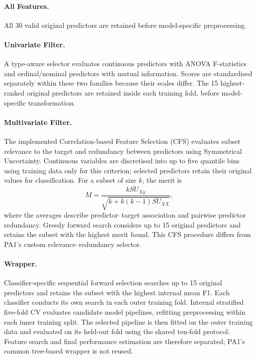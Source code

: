 \paragraph{All Features.} All 30 valid original predictors are retained before model-specific preprocessing.

\paragraph{Univariate Filter.} A type-aware selector evaluates continuous predictors with ANOVA F-statistics and ordinal/nominal predictors with mutual information. Scores are standardised separately within these two families because their scales differ. The 15 highest-ranked original predictors are retained inside each training fold, before model-specific transformation.

\paragraph{Multivariate Filter.} The implemented Correlation-based Feature Selection (CFS) evaluates subset relevance to the target and redundancy between predictors using Symmetrical Uncertainty. Continuous variables are discretised into up to five quantile bins using training data only for this criterion; selected predictors retain their original values for classification. For a subset of size $k$, the merit is
\[
 M=\frac{k\overline{SU}_{Xy}}
 {\sqrt{k+k(k-1)\overline{SU}_{XX}}},
\]
where the averages describe predictor--target association and pairwise predictor redundancy. Greedy forward search considers up to 15 original predictors and retains the subset with the highest merit found. This CFS procedure differs from PA1's custom relevance--redundancy selector.

\paragraph{Wrapper.} Classifier-specific sequential forward selection searches up to 15 original predictors and retains the subset with the highest internal mean F1. Each classifier conducts its own search in each outer training fold. Internal stratified five-fold CV evaluates candidate model pipelines, refitting preprocessing within each inner training split. The selected pipeline is then fitted on the outer training data and evaluated on its held-out fold using the shared ten-fold protocol. Feature search and final performance estimation are therefore separated; PA1's common tree-based wrapper is not reused.

